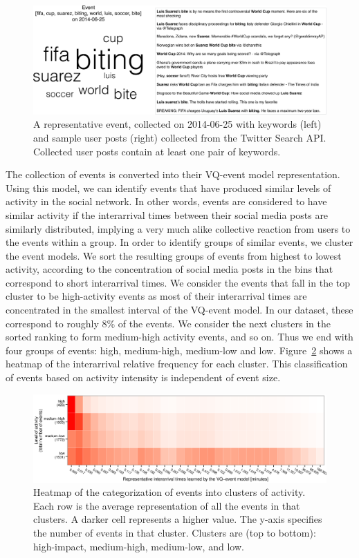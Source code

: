 \begin{figure}
  \includegraphics[width=\textwidth]{figures/high-activity/fig2}
  \caption[Example event]{A representative event, collected on 2014-06-25 with
      keywords (left) and sample user posts (right) collected from the Twitter
      Search API. Collected user posts contain at least one pair of keywords. }
  \label{fig:hi:components}
\end{figure}


The collection of events is converted into their VQ-event model representation. 
%
Using this model, we can identify events that have produced similar levels of
activity in the social network. 
%
In other words, events are considered to have similar activity if the
interarrival times between their social media posts are similarly distributed,
implying a very much alike collective reaction from users to the events within a
group. 
%
In order to identify groups of similar events, we cluster the event models. 
%
We sort the resulting groups of events from highest to lowest activity,
according to the concentration of social media posts in the bins that correspond
to short interarrival times. 
%
We consider the events that fall in the top cluster to be high-activity events
as most of their interarrival times are concentrated in the smallest interval of
the VQ-event model.
%
In our dataset, these correspond to roughly 8\% of the events. 
%
We consider the next clusters in the sorted ranking to form medium-high activity
events, and so on. 
%
Thus we end with four groups of events: high, medium-high, medium-low and low.
Figure~\ref{fig:hi:heatmap} shows a heatmap of the interarrival relative
frequency for each cluster. 
%
This classification of events based on activity intensity is independent of
event size. 


\begin{figure}
  \includegraphics[width=\textwidth]{figures/high-activity/fig3}
  \caption[Heatmap of the categorization of events into clusters of
  activity.]{{Heatmap of the categorization of events into clusters of activity.
  Each row is the average representation of all the events in that clusters.  A
  darker cell represents a higher value. The y-axis specifies the number of
  events in that cluster. Clusters are (top to bottom): high-impact,
  medium-high, medium-low, and low.}}
  \label{fig:hi:heatmap}
\end{figure}